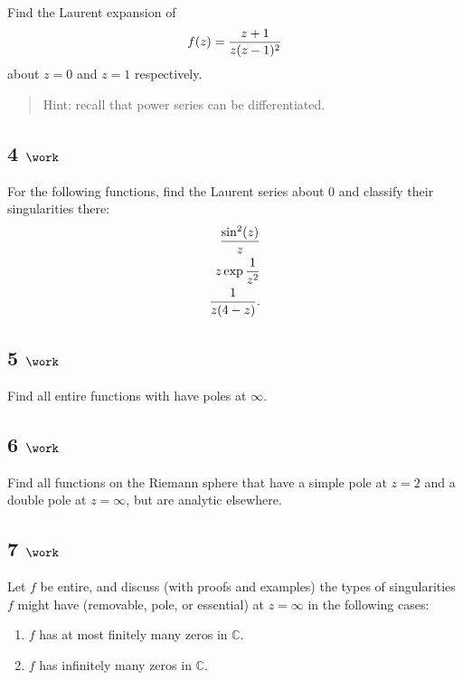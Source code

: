 Find the Laurent expansion of
\begin{align*}
f(z) = {z+1 \over z(z-1)^2}
\end{align*}
about \(z=0\) and \(z=1\) respectively.

\begin{quote}
Hint: recall that power series can be differentiated.
\end{quote}

\hypertarget{work-31}{%
\subsection{\texorpdfstring{4
\(\work\)}{4 \textbackslash work}}\label{work-31}}

For the following functions, find the Laurent series about \(0\) and
classify their singularities there:
\begin{align*}
{\sin^2(z) \over z} \\
z \exp{1\over z^2} \\
{1 \over z(4-z)}
.\end{align*}

\hypertarget{work-32}{%
\subsection{\texorpdfstring{5
\(\work\)}{5 \textbackslash work}}\label{work-32}}

Find all entire functions with have poles at \(\infty\).

\hypertarget{work-33}{%
\subsection{\texorpdfstring{6
\(\work\)}{6 \textbackslash work}}\label{work-33}}

Find all functions on the Riemann sphere that have a simple pole at
\(z=2\) and a double pole at \(z=\infty\), but are analytic elsewhere.

\hypertarget{work-34}{%
\subsection{\texorpdfstring{7
\(\work\)}{7 \textbackslash work}}\label{work-34}}

Let \(f\) be entire, and discuss (with proofs and examples) the types of
singularities \(f\) might have (removable, pole, or essential) at
\(z=\infty\) in the following cases:

\begin{enumerate}
\def\labelenumi{\arabic{enumi}.}
\tightlist
\item
  \(f\) has at most finitely many zeros in \({\mathbb{C}}\).
\item
  \(f\) has infinitely many zeros in \({\mathbb{C}}\).
\end{enumerate}

